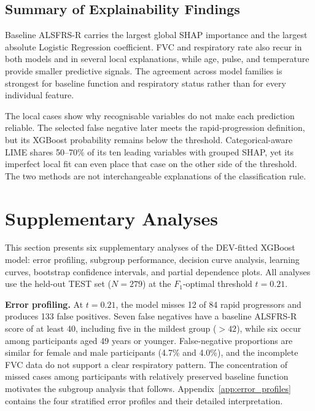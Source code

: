 \subsection{Summary of Explainability Findings}
\label{subsec:results_xai_summary}

Baseline ALSFRS-R carries the largest global SHAP importance and the largest absolute Logistic Regression coefficient. FVC and respiratory rate also recur in both models and in several local explanations, while age, pulse, and temperature provide smaller predictive signals. The agreement across model families is strongest for baseline function and respiratory status rather than for every individual feature.

The local cases show why recognisable variables do not make each prediction reliable. The selected false negative later meets the rapid-progression definition, but its XGBoost probability remains below the threshold. Categorical-aware LIME shares 50--70\% of its ten leading variables with grouped SHAP, yet its imperfect local fit can even place that case on the other side of the threshold. The two methods are not interchangeable explanations of the classification rule.


\section{Supplementary Analyses}
\label{sec:results_supplementary}

This section presents six supplementary analyses of the DEV-fitted XGBoost model: error profiling, subgroup performance, decision curve analysis, learning curves, bootstrap confidence intervals, and partial dependence plots.
All analyses use the held-out TEST set ($N\!=\!279$) at the $F_1$-optimal threshold $t\!=\!0.21$.

\label{subsec:results_error_profile}
\noindent\textbf{Error profiling.}
At $t=0.21$, the model misses 12 of 84 rapid progressors and produces 133 false positives. Seven false negatives have a baseline \gls{ALSFRS-R} score of at least 40, including five in the mildest group ($>42$), while six occur among participants aged 49 years or younger. False-negative proportions are similar for female and male participants (4.7\% and 4.0\%), and the incomplete \gls{FVC} data do not support a clear respiratory pattern. The concentration of missed cases among participants with relatively preserved baseline function motivates the subgroup analysis that follows. Appendix~\ref{app:error_profiles} contains the four stratified error profiles and their detailed interpretation.

